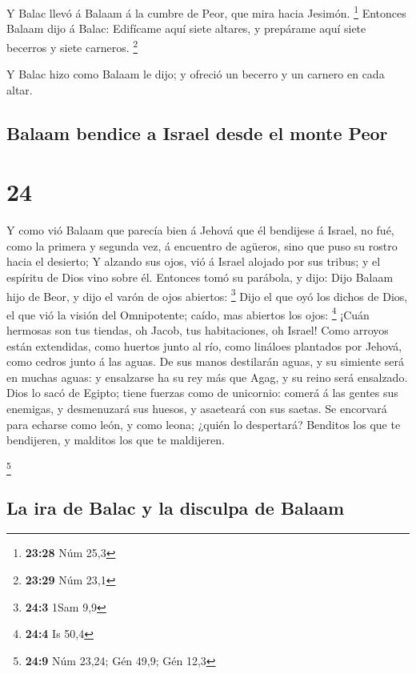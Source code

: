  Y Balac llevó á Balaam á la cumbre de Peor, que mira
hacia Jesimón. \footnote{\textbf{23:28} Núm 25,3} 
Entonces Balaam dijo á Balac: Edifícame aquí siete altares, y prepárame
aquí siete becerros y siete carneros. \footnote{\textbf{23:29} Núm 23,1}

 Y Balac hizo como Balaam le dijo; y ofreció un becerro y
un carnero en cada altar.

\hypertarget{balaam-bendice-a-israel-desde-el-monte-peor}{%
\subsection{Balaam bendice a Israel desde el monte
Peor}\label{balaam-bendice-a-israel-desde-el-monte-peor}}

\hypertarget{section-23}{%
\section{24}\label{section-23}}

 Y como vió Balaam que parecía bien á Jehová que él
bendijese á Israel, no fué, como la primera y segunda vez, á encuentro
de agüeros, sino que puso su rostro hacia el desierto;  Y
alzando sus ojos, vió á Israel alojado por sus tribus; y el espíritu de
Dios vino sobre él.  Entonces tomó su parábola, y dijo:
Dijo Balaam hijo de Beor, y dijo el varón de ojos abiertos: \footnote{\textbf{24:3}
  1Sam 9,9}  Dijo el que oyó los dichos de Dios, el que
vió la visión del Omnipotente; caído, mas abiertos los ojos: \footnote{\textbf{24:4}
  Is 50,4}  ¡Cuán hermosas son tus tiendas, oh Jacob, tus
habitaciones, oh Israel!  Como arroyos están extendidas,
como huertos junto al río, como lináloes plantados por Jehová, como
cedros junto á las aguas.  De sus manos destilarán aguas,
y su simiente será en muchas aguas: y ensalzarse ha su rey más que Agag,
y su reino será ensalzado.  Dios lo sacó de Egipto; tiene
fuerzas como de unicornio: comerá á las gentes sus enemigas, y
desmenuzará sus huesos, y asaeteará con sus saetas.  Se
encorvará para echarse como león, y como leona; ¿quién lo despertará?
Benditos los que te bendijeren, y malditos los que te maldijeren.

\footnote{\textbf{24:9} Núm 23,24; Gén 49,9; Gén 12,3}

\hypertarget{la-ira-de-balac-y-la-disculpa-de-balaam}{%
\subsection{La ira de Balac y la disculpa de
Balaam}\label{la-ira-de-balac-y-la-disculpa-de-balaam}}

